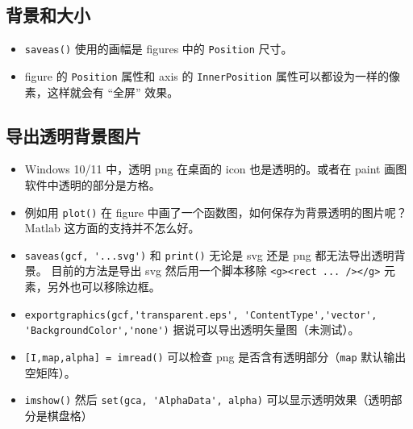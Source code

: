 
\subsection{背景和大小}
\begin{itemize}
\item \verb`saveas()` 使用的画幅是 figures 中的 \verb`Position` 尺寸。
\item figure 的 \verb`Position` 属性和 axis 的 \verb`InnerPosition` 属性可以都设为一样的像素，这样就会有 “全屏” 效果。
\end{itemize}

\subsection{导出透明背景图片}
\begin{itemize}
\ite
\item Windows 10/11 中，透明 png 在桌面的 icon 也是透明的。或者在 paint 画图软件中透明的部分是方格。
\item 例如用 \verb`plot()` 在 figure 中画了一个函数图，如何保存为背景透明的图片呢？ Matlab 这方面的支持并不怎么好。
\item \verb`saveas(gcf, '...svg')` 和 \verb`print()` 无论是 svg 还是 png 都无法导出透明背景。 目前的方法是导出 svg 然后用一个脚本移除 \verb`<g><rect ... /></g>` 元素，另外也可以移除边框。
\item \verb`exportgraphics(gcf,'transparent.eps', 'ContentType','vector', 'BackgroundColor','none')` 据说可以导出透明矢量图（未测试）。
\item \verb`[I,map,alpha] = imread()` 可以检查 png 是否含有透明部分（\verb`map` 默认输出空矩阵）。
\item \verb`imshow()` 然后 \verb`set(gca, 'AlphaData', alpha)` 可以显示透明效果（透明部分是棋盘格）
\end{itemize}
